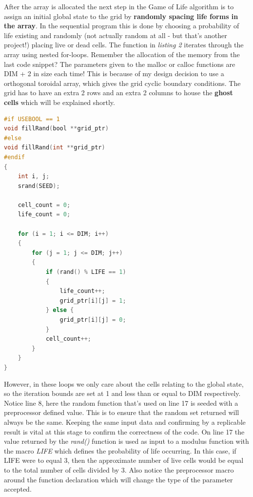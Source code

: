 \documentclass[11pt]{article} %
\begin{document}
\smallskip
After the array is allocated the next step in the Game of Life algorithm is to assign an initial global state to the grid by {\bf randomly spacing life forms in the array}. In the sequential program this is done by choosing a probability of life existing and randomly (not actually random at all - but that's another project!) placing live or dead cells. The function in {\it listing 2} iterates through the array using nested for-loops. Remember the allocation of the memory from the last code snippet? The parameters given to the malloc or calloc functions are DIM + 2 in size each time! This is because of my design decision to use a orthogonal toroidal array, which gives the grid cyclic boundary conditions. The grid has to have an extra 2 rows and an extra 2 columns to house the {\bf ghost cells} which will be explained shortly.
\begin{lstlisting}[language=C,caption={Randomly spacing lifeforms in the array}, morekeywords={malloc,calloc,bool}]
#if USEBOOL == 1
void fillRand(bool **grid_ptr)
#else
void fillRand(int **grid_ptr)
#endif
{
	int i, j;
	srand(SEED);

	cell_count = 0;
	life_count = 0;

	for (i = 1; i <= DIM; i++)
	{
		for (j = 1; j <= DIM; j++)
		{
			if (rand() % LIFE == 1)
			{
				life_count++;
				grid_ptr[i][j] = 1;
			} else {
				grid_ptr[i][j] = 0;
			}
			cell_count++;
		}
	}
}
\end{lstlisting}
However, in these loops we only care about the cells relating to the global state, so the iteration bounds are set at 1 and less than or equal to DIM respectively. Notice line 8, here the random function that's used on line 17 is seeded with a preprocessor defined value. This is to ensure that the random set returned will always be the same. Keeping the same input data and confirming by a replicable result is vital at this stage to confirm the correctness of the code. On line 17 the value returned by the {\it rand()} function is used as input to a modulus function with the macro {\it LIFE} which defines the probability of life occurring. In this case, if LIFE were to equal 3, then the approximate number of live cells would be equal to the total number of cells divided by 3. Also notice the preprocessor macro around the function declaration which will change the type of the parameter accepted.\\\\
\end{document}
